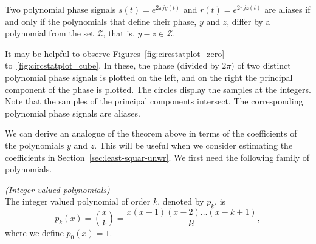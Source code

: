 \documentclass[journal]{IEEEtran}
\begin{document}
\begin{theorem}\label{thm:circpolysampledthm}
Two polynomial phase signals $s(t) = e^{2\pi j y(t)}$  and $r(t) = e^{2\pi j z(t)}$  are aliases if and only if the polynomials that define their phase, $y$ and $z$, differ by a polynomial from the set $\mathcal{Z}$, that is, $y - z \in \mathcal{Z}$.
\end{theorem}



It may be helpful to observe Figures~\ref{fig:circstatplot_zero} to~\ref{fig:circstatplot_cube}.  In these, the phase (divided by $2\pi$) of two distinct polynomial phase signals is plotted on the left, and on the right the principal component of the phase is plotted. The circles display the samples at the integers. Note that the samples of the principal components intersect.  The corresponding polynomial phase signals are aliases.

We can derive an analogue of the theorem above in terms of the coefficients of the polynomials $y$ and $z$. This will be useful when we consider estimating the coefficients in Section~\ref{sec:least-squar-unwr}.  We first need the following family of polynomials. 

\begin{definition} \emph{(Integer valued polynomials)} \label{def:intvaledpolys}
\\The integer valued polynomial of order $k$, denoted by $p_k$, is
\[
p_k(x) = \binom{x}{k} = \frac{x(x-1)(x-2)\dots(x-k+1)}{k!},
\]
where we define $p_0(x) = 1$.
\end{definition}
\end{document}
